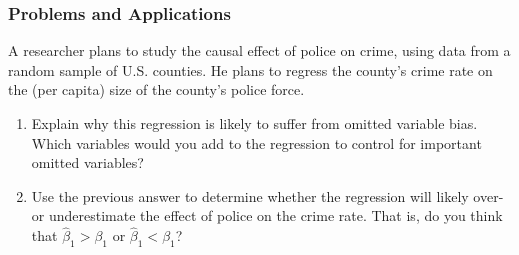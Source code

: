 

\begin{frame}
\frametitle{Problems and Applications}
A researcher plans to study the causal effect of police on crime, using data from a random sample of U.S. counties. He plans to regress the county's crime rate on the (per capita) size of the county's police force.
\begin{enumerate}
\item Explain why this regression is likely to suffer from omitted variable bias. Which variables would you add to the regression to control for important omitted variables?
\item Use the previous answer to determine whether the regression will likely over- or underestimate the effect of police on the crime rate. That is, do you think that $\hat{\beta}_{1}>\beta_{1}$ or $\hat{\beta}_{1}<\beta_{1}$?
\end{enumerate}
\end{frame}

